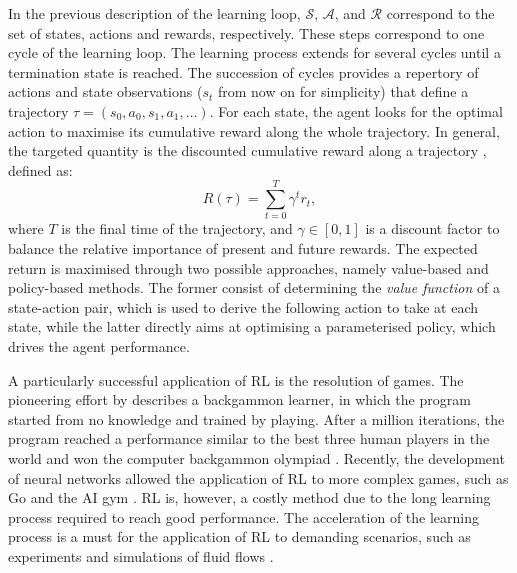 In the previous description of the learning loop, $\mathcal{S}$, $\mathcal{A}$, and $\mathcal{R}$ correspond to the set of states, actions and rewards, respectively. These steps correspond to one cycle of the learning loop. The learning process extends for several cycles until a termination state is reached. The succession of cycles provides a repertory of actions and state observations ($s_t$ from now on for simplicity) that define a trajectory $\tau = (s_0,a_0,s_1,a_1,\dots)$. For each state, the agent looks for the optimal action to maximise its cumulative reward along the whole trajectory. In general, the targeted quantity is the discounted cumulative reward along a trajectory \citep{Viquerat2021RLrev}, defined as:
%
\begin{equation}
    R(\tau) = \sum_{t=0}^T \gamma^t r_t,
\end{equation}
%
where $T$ is the final time of the trajectory, and  $\gamma \in [0,1]$ is a discount factor to balance the relative importance of present and future rewards. The expected return is maximised through two possible approaches, namely value-based and policy-based methods. The former consist of determining the \textit{value function} \citep{sutton2018reinforcement} of a state-action pair, which is used to derive the following action to take at each state, while the latter directly aims at optimising a parameterised policy, which drives the agent performance.

A particularly successful application of RL is the resolution of games. The pioneering effort by \citet{Tesauro1992difflearn} describes a backgammon learner, in which the program started from no knowledge and trained by playing. After a million iterations, the program reached a performance similar to the best three human players in the world and won the computer backgammon olympiad \citep{BruntonNoackKoumoutsakos2020}. Recently, the development of neural networks allowed the application of RL to more complex games, such as Go \citep{mnih2015DRL} and the AI gym \citep{mnih2015DRL,Silver2016go}. RL is, however, a costly method due to the long learning process required to reach good performance. The acceleration of the learning process is a must for the application of RL to demanding scenarios, such as experiments and simulations of fluid flows \citep{Verma2018swimDRL}.

